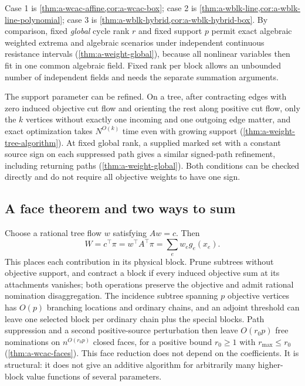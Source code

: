 Case 1 is \cref{thm:a-wcac-affine,cor:a-wcac-box}; case 2 is
\cref{thm:a-wblk-line,cor:a-wblk-line-polynomial}; case 3 is
\cref{thm:a-wblk-hybrid,cor:a-wblk-hybrid-box}.
By comparison, fixed \emph{global} cycle rank $r$ and fixed support
$p$ permit exact algebraic weighted extrema and algebraic scenarios
under independent continuous resistance intervals
(\cref{thm:a-weight-global}), because all nonlinear variables then fit
in one common algebraic field. Fixed rank per block allows an unbounded
number of independent fields and needs the separate summation arguments.

The support parameter can be refined. On a tree, after contracting
edges with zero induced objective cut flow and orienting the rest along
positive cut flow, only the $k$ vertices without exactly one incoming
and one outgoing edge matter, and exact optimization takes $N^{O(k)}$
time even with growing support (\cref{thm:a-weight-tree-algorithm}).
At fixed global rank, a supplied marked set with a constant source sign
on each suppressed path gives a similar signed-path refinement,
including returning paths
(\cref{thm:a-weight-global}). Both conditions can be checked directly
and do not require all objective weights to have one sign.

\subsection{A face theorem and two ways to sum}

Choose a rational tree flow $w$ satisfying $Aw=c$. Then
\[
 W=c^\top\pi=w^\top A^\top\pi=\sum_e w_eg_e(x_e).
\]
This places each contribution in its physical block. Prune subtrees
without objective support, and contract a block if every induced
objective sum at its attachments vanishes; both operations preserve the
objective and admit rational nomination disaggregation. The incidence
subtree spanning $p$ objective vertices has $O(p)$ branching locations
and ordinary chains, and an adjoint threshold can leave one selected
block per ordinary chain plus the special blocks. Path suppression and a
second positive-source perturbation then leave $O(r_0p)$ free nominations
on $n^{O(r_0p)}$ closed faces, for a positive bound $r_0\ge1$ with
$r_{\max}\le r_0$ (\cref{thm:a-wcac-faces}). This face reduction does
not depend on the coefficients. It is structural: it does not give an
additive algorithm for arbitrarily many higher-block value functions of
several parameters.

